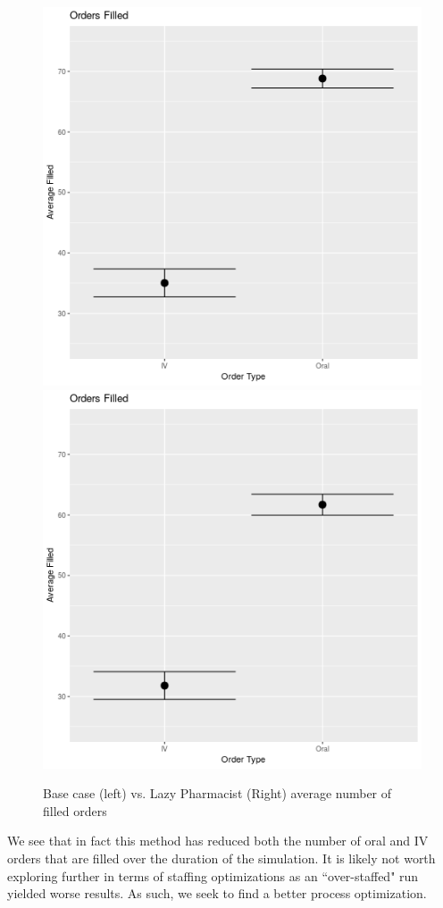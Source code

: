 \documentclass[10pt]{report}            %
\begin{document}
\begin{figure}[H]
\centering
\includegraphics[scale=.35]{BaseFilledCIs.png}
\includegraphics[scale=.35]{ProfFilledCIs.png}
\caption{Base case (left) vs. Lazy Pharmacist (Right) average number of filled orders}
\label{fig:baseprofFill}
\end{figure}
We see that in fact this method has reduced both the number of oral and IV orders that are filled over the duration of the simulation. It is likely not worth exploring further in terms of staffing optimizations as an ``over-staffed" run yielded worse results. As such, we seek to find a better process optimization.
\end{document}
